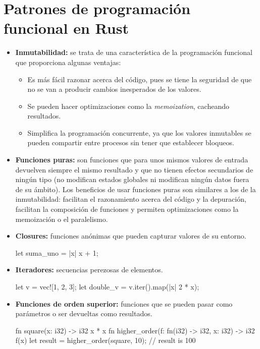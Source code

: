 \section{Patrones de programación funcional en Rust}
\begin{itemize}
   \item \textbf{Inmutabilidad:} se trata de una característica de la programación funcional que proporciona algunas ventajas: 
   \begin{itemize}
      \item Es más fácil razonar acerca del código, pues se tiene la seguridad de que no se van a producir cambios inesperados de los valores.
      \item Se pueden hacer optimizaciones como la \textit{memoization}, cacheando resultados.
      \item Simplifica la programación concurrente, ya que los valores inmutables se pueden compartir entre procesos sin tener que establecer bloqueos.
   \end{itemize}
   \item \textbf{Funciones puras:} son funciones que para unos mismos valores de entrada devuelven siempre el mismo resultado y que no tienen efectos secundarios de ningún tipo (no modifican estados globales ni modifican ningún datos fuera de su ámbito). Los beneficios de usar funciones puras son similares a los de la inmutabilidad: facilitan el razonamiento acerca del código y la depuración, facilitan la composición de funciones y permiten optimizaciones como la memoización o el paralelismo. 
   \item \textbf{Closures:} funciones anónimas que pueden capturar valores de su entorno.
   \begin{Codigo}
      let suma_uno = |x| x + 1;
   \end{Codigo}
   \item \textbf{Iteradores:} secuencias perezosas de elementos.
   \begin{Codigo}
      let v = vec![1, 2, 3];
      let double_v = v.iter().map(|x| 2 * x);
   \end{Codigo}
   \item \textbf{Funciones de orden superior:} funciones que se pueden pasar como parámetros o ser devueltas como resultados. 
   \begin{Codigo}
      fn square(x: i32) -> i32 {
         x * x
      }
      fn higher_order(f: fn(i32) -> i32, x: i32) -> i32 {
         f(x)
      }
      let result = higher_order(square, 10); // result is 100
   \end{Codigo}
   

\end{itemize}
